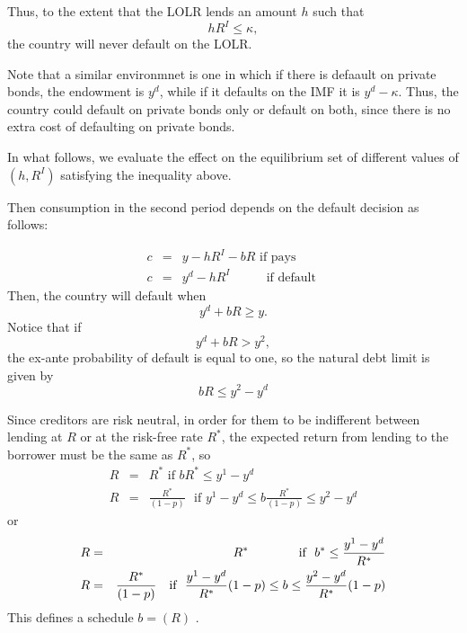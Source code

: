 \documentclass[english,12pt,a4paper]{article}
\begin{document}
Thus, to the extent that the LOLR lends an amount $h$ such that%
\begin{equation*}
hR^{I}\leq \kappa ,
\end{equation*}%
the country will never default on the LOLR.

Note that a similar environmnet is one in which if there is defaault on
private bonds, the endowment is $y^{d}$, while if it defaults on the IMF it
is $y^{d}-\kappa $. Thus, the country could default on private bonds only or
default on both, since there is no extra cost of defaulting on private bonds.

In what follows, we evaluate the effect on the equilibrium set of different
values of $(h,R^{I})$ satisfying the inequality above.

Then consumption in the second period depends on the default decision as
follows:

\begin{eqnarray*}
c &=&y-hR^{I}-bR\text{ \ \ \ if pays} \\
c &=&y^{d}-hR^{I}\text{ }\ \ \ \ \ \ \ \ \ \ \text{if default }
\end{eqnarray*}%
Then, the country will default when 
\begin{equation*}
y^{d}+bR\geq y.
\end{equation*}%
Notice that if 
\begin{equation*}
y^{d}+bR>y^{2},
\end{equation*}%
the ex-ante probability of default is equal to one, so the natural debt
limit is given by 
\begin{equation*}
bR\leq y^{2}-y^{d}
\end{equation*}

Since creditors are risk neutral, in order for them to be indifferent
between lending at $R$ or at the risk-free rate $R^{\ast }$, the expected
return from lending to the borrower must be the same as $R^{\ast }$, so%
\begin{eqnarray*}
R &=&R^{\ast }\text{ \ \ \ \ \ \ \ \ \ \ \ \ \ if }bR^{\ast }\leq y^{1}-y^{d}
\\
R &=&\frac{R^{\ast }}{(1-p)}\ \ \ \text{if }y^{1}-y^{d}\leq b\frac{R^{\ast }%
}{(1-p)}\leq y^{2}-y^{d}
\end{eqnarray*}%
or%
\begin{eqnarray*}
R &=&R^{\ast }\text{ \ \ \ \ \ \ \ \ \ \ \ if \ }b^{\ast }\leq \frac{%
y^{1}-y^{d}}{R^{\ast }} \\
R &=&\frac{R^{\ast }}{(1-p)}\ \ \ \text{if \ }\frac{y^{1}-y^{d}}{R^{\ast }}%
(1-p)\leq b\leq \frac{y^{2}-y^{d}}{R^{\ast }}(1-p)
\end{eqnarray*}
This defines a schedule $b=\left( R\right) $ .
\end{document}
